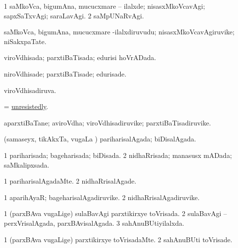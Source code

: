 \bentry
{} 
\gl{\kirxvi}
\expl{}
\bmng
\bnum
\num{1} saMkoVca, bigumAna, mucucxmare -- ilalxde; nisasxMkoVcavAgi; sapxSaTxvAgi; saraLavAgi. 
\num{2} saMpUNaRvAgi. 
\enum
\emng
\eentry

\bentry
{} 
\gl{\nA}
\expl{}
\bmng
saMkoVca, bigumAna, mucucxmare -ilalxdiruvudu; nisasxMkoVcavAgiruvike; niSakxpaTate. 
\emng
\eentry

\bentry
{} 
\gl{\gu}
\expl{}
\bmng
viroVdhisada; parxtiBaTisada; edurisi hoVrADada. 
\emng
\eentry

\bentry
{} 
\gl{\kirxvi}
\expl{}
\bmng
niroVdhisade; parxtiBaTisade; edurisade. 
\emng
\eentry

\bentry
{} 
\gl{\gu}
\expl{}
\bmng
viroVdhisadiruva. 
\emng
\eentry

\bentry
{} 
\gl{\kirxvi}
\expl{}
\bmng
= \hyperlink{unresistedly}{unresistedly}. 
\emng
\eentry

\bentry 
{} 
\gl{\nA}
\expl{}
\bmng
aparxtiBaTane; aviroVdha; viroVdhisadiruvike; parxtiBaTisadiruvike. 
\emng
\eentry

\bentry
{} 
\gl{\gu}
\expl{}
\bmng
(samaseyx, tikAkxTa, \mo vugaLa \vi) pariharisalAgada; biDisalAgada. 
\emng
\eentry

\bentry
{} 
\gl{\gu}
\expl{}
\bmng
\bnum
\num{1} pariharisada; bageharisada; biDisada. 
\num{2} nidhaRrisada; manasusx mADada; saMkalipxsada. 
\enum
\emng
\eentry

\bentry
{} 
\gl{\kirxvi}
\expl{}
\bmng
\bnum
\num{1} pariharisalAgadaMte. 
\num{2} nidhaRrisalAgade. 
\enum
\emng
\eentry

\bentry
{} 
\gl{\nA}
\expl{}
\bmng
\bnum
\num{1} aparihAyaR; bageharisalAgadiruvike. 
\num{2} nidhaRrisalAgadiruvike. 
\enum
\emng
\eentry

\bentry
{} 
\gl{\gu}
\expl{}
\bmng
\bnum
\num{1} (parxBAva \mo vugaLige) sulaBavAgi parxtikirxye toVrisada. 
\num{2} sulaBavAgi -- perxVrisalAgada, parxBAvisalAgada. 
\num{3} sahAnuBUtiyilalxda. 
\enum
\emng
\eentry

\bentry
{} 
\gl{\kirxvi}
\expl{}
\bmng
\bnum
\num{1} (parxBAva \mo vugaLige) parxtikirxye toVrisadaMte. 
\num{2} sahAnuBUti toVrisade. 
\enum
\emng
\eentry

